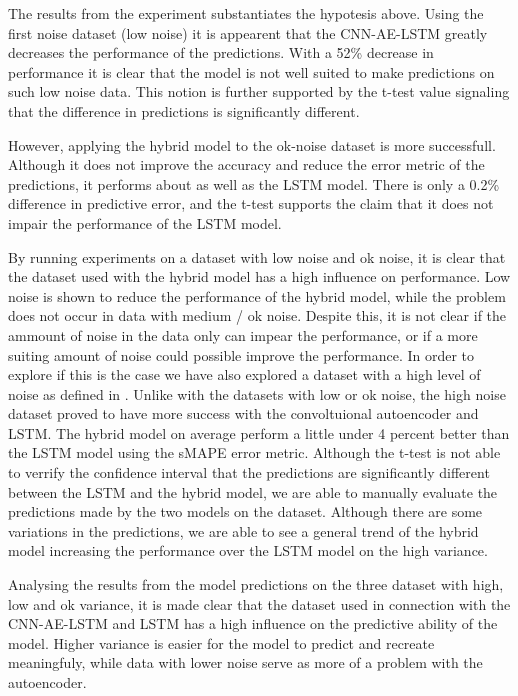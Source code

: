 
The results from the experiment substantiates the hypotesis above.
Using the first noise dataset (low noise) it is appearent that the CNN-AE-LSTM greatly decreases the performance of the predictions.
With a 52\% decrease in performance it is clear that the model is not well suited to make predictions on such low noise data.
This notion is further supported by the t-test value signaling that the difference in predictions is significantly different.

However, applying the hybrid model to the ok-noise dataset is more successfull.
Although it does not improve the accuracy and reduce the error metric of the predictions,
it performs about as well as the LSTM model. There is only a 0.2\% difference in predictive error,
and the t-test supports the claim that it does not impair the performance of the LSTM model.

By running experiments on a dataset with low noise and ok noise, it is clear that the dataset used with the hybrid model has a high influence on performance.
Low noise is shown to reduce the performance of the hybrid model, while the problem does not occur in data with medium / ok noise.
Despite this, it is not clear if the ammount of noise in the data only can impear the performance,
or if a more suiting amount of noise could possible improve the performance.
In order to explore if this is the case we have also explored a dataset with a high level of noise as defined in .
Unlike with the datasets with low or ok noise, the high noise dataset proved to have more success with the convoltuional autoencoder and LSTM.
The hybrid model on average perform a little under 4 percent better than the LSTM model using the sMAPE error metric.
Although the t-test is not able to verrify the confidence interval that the predictions are significantly different between the LSTM and the hybrid model,
we are able to manually evaluate the predictions made by the two models on the dataset.
Although there are some variations in the predictions, we are able to see a general trend of the hybrid model increasing the performance over the LSTM model on the high variance.

Analysing the results from the model predictions on the three dataset with high, low and ok variance,
it is made clear that the dataset used in connection with the CNN-AE-LSTM and LSTM
has a high influence on the predictive ability of the model.
Higher variance is easier for the model to predict and recreate meaningfuly,
while data with lower noise serve as more of a problem with the autoencoder.

